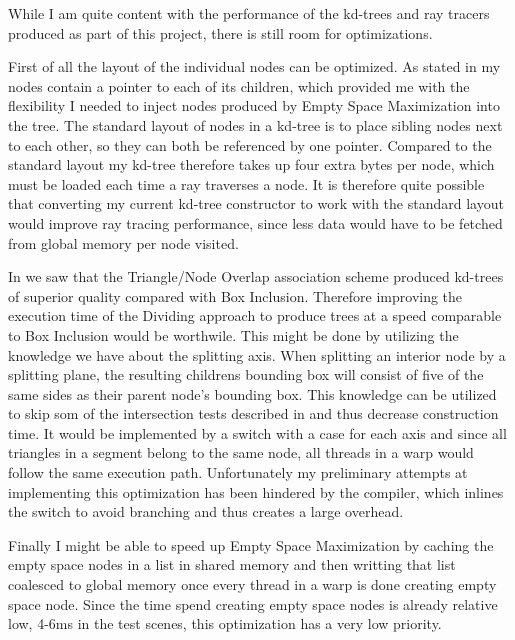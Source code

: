 
While I am quite content with the performance of the kd-trees and ray tracers
produced as part of this project, there is still room for optimizations.


First of all the layout of the individual nodes can be optimized. As stated in
 my nodes contain a pointer to each of its
children, which provided me with the flexibility I needed to inject nodes
produced by Empty Space Maximization into the tree. The standard layout of nodes
in a kd-tree is to place sibling nodes next to each other, so they can both be
referenced by one pointer. Compared to the standard layout my kd-tree therefore
takes up four extra bytes per node, which must be loaded each time a ray
traverses a node. It is therefore quite possible that converting my current
kd-tree constructor to work with the standard layout would improve ray tracing
performance, since less data would have to be fetched from global memory per
node visited.



In  we saw that the Triangle/Node Overlap association
scheme produced kd-trees of superior quality compared with Box
Inclusion. Therefore improving the execution time of the Dividing approach to
produce trees at a speed comparable to Box Inclusion would be worthwile. This
might be done by utilizing the knowledge we have about the splitting axis. When
splitting an interior node by a splitting plane, the resulting childrens
bounding box will consist of five of the same sides as their parent node's
bounding box. This knowledge can be utilized to skip som of the intersection
tests described in  and thus decrease construction
time. It would be implemented by a switch with a case for each axis and since
all triangles in a segment belong to the same node, all threads in a warp would
follow the same execution path. Unfortunately my preliminary attempts at
implementing this optimization has been hindered by the compiler, which inlines
the switch to avoid branching and thus creates a large overhead.


Finally I might be able to speed up Empty Space Maximization by caching the
empty space nodes in a list in shared memory and then writting that list
coalesced to global memory once every thread in a warp is done creating empty
space node. Since the time spend creating empty space nodes is already relative
low, 4-6ms in the test scenes, this optimization has a very low priority.







